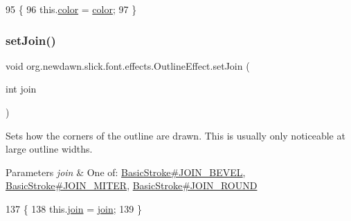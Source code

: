 \begin{DoxyCode}
95                                       \{
96         this.\mbox{\hyperlink{classorg_1_1newdawn_1_1slick_1_1font_1_1effects_1_1_outline_effect_a00160c4c005cb659d45c135a2798005f}{color}} = \mbox{\hyperlink{classorg_1_1newdawn_1_1slick_1_1font_1_1effects_1_1_outline_effect_a00160c4c005cb659d45c135a2798005f}{color}};
97     \}
\end{DoxyCode}
\mbox{\label{classorg_1_1newdawn_1_1slick_1_1font_1_1effects_1_1_outline_effect_a7f5b6e68f1c83e5d9b8b1c271d1a8577}} 
\subsubsection{\texorpdfstring{set\+Join()}{setJoin()}}
{\footnotesize\ttfamily void org.\+newdawn.\+slick.\+font.\+effects.\+Outline\+Effect.\+set\+Join (\begin{DoxyParamCaption}\item[{int}]{join }\end{DoxyParamCaption})\hspace{0.3cm}{\ttfamily [inline]}}

Sets how the corners of the outline are drawn. This is usually only noticeable at large outline widths.


\begin{DoxyParams}{Parameters}
{\em join} & One of\+: \mbox{\hyperlink{}{Basic\+Stroke\#\+J\+O\+I\+N\+\_\+\+B\+E\+V\+EL}}, \mbox{\hyperlink{}{Basic\+Stroke\#\+J\+O\+I\+N\+\_\+\+M\+I\+T\+ER}}, \mbox{\hyperlink{}{Basic\+Stroke\#\+J\+O\+I\+N\+\_\+\+R\+O\+U\+ND}} \\
\hline
\end{DoxyParams}

\begin{DoxyCode}
137                                    \{
138         this.\mbox{\hyperlink{classorg_1_1newdawn_1_1slick_1_1font_1_1effects_1_1_outline_effect_a913a20571098d37c45f5aff95ff844f9}{join}} = \mbox{\hyperlink{classorg_1_1newdawn_1_1slick_1_1font_1_1effects_1_1_outline_effect_a913a20571098d37c45f5aff95ff844f9}{join}};
139     \}
\end{DoxyCode}
\mbox{\label{classorg_1_1newdawn_1_1slick_1_1font_1_1effects_1_1_outline_effect_aaea80188301a66f869e1a6e3d5cd5cf7}} 
